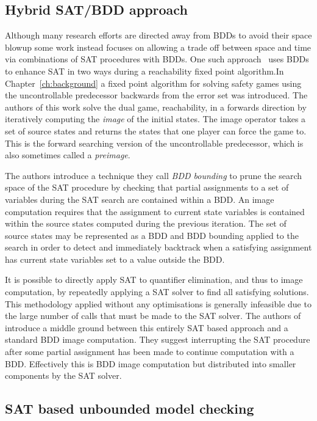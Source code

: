 \subsection{Hybrid SAT/BDD approach}

Although many research efforts are directed away from BDDs to avoid their space blowup some work instead focuses on allowing a trade off between space and time via combinations of SAT procedures with BDDs. One such approach~\cite{Gupta00} uses BDDs to enhance SAT in two ways during a reachability fixed point algorithm.In Chapter~\ref{ch:background} a fixed point algorithm for solving safety games using the uncontrollable predecessor backwards from the error set was introduced. The authors of this work solve the dual game, reachability, in a forwards direction by iteratively computing the \emph{image} of the initial states. The image operator takes a set of source states and returns the states that one player can force the game to. This is the forward searching version of the uncontrollable predecessor, which is also sometimes called a \emph{preimage}.

The authors introduce a technique they call \emph{BDD bounding} to prune the search space of the SAT procedure by checking that partial assignments to a set of variables during the SAT search are contained within a BDD. An image computation requires that the assignment to current state variables is contained within the source states computed during the previous iteration. The set of source states may be represented as a BDD and BDD bounding applied to the search in order to detect and immediately backtrack when a satisfying assignment has current state variables set to a value outside the BDD.

It is possible to directly apply SAT to quantifier elimination, and thus to image computation, by repeatedly applying a SAT solver to find all satisfying solutions. This methodology applied without any optimisations is generally infeasible due to the large number of calls that must be made to the SAT solver. The authors of \cite{Gupta00} introduce a middle ground between this entirely SAT based approach and a standard BDD image computation. They suggest interrupting the SAT procedure after some partial assignment has been made to continue computation with a BDD. Effectively this is BDD image computation but distributed into smaller components by the SAT solver.

\subsection{SAT based unbounded model checking}

